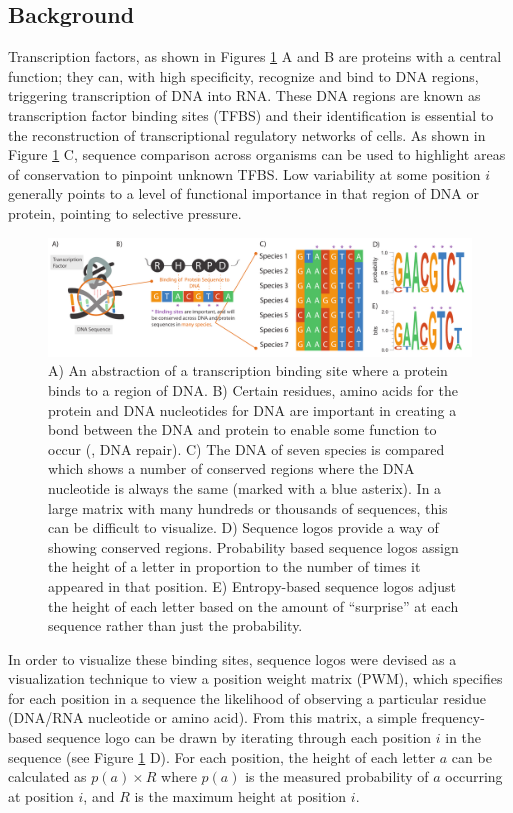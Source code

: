 \subsection{Background}

Transcription factors, as shown in Figures \ref{fig:binding} A and B are proteins with a central function; they can, with high specificity, recognize and bind to DNA regions, triggering transcription of DNA into RNA.
These DNA regions are known as transcription factor binding sites (TFBS) and their identification is essential to the reconstruction of transcriptional regulatory networks of cells.
As shown in Figure \ref{fig:binding} C, sequence comparison across organisms can be used to highlight areas of conservation to pinpoint unknown TFBS.
Low variability at some position $i$ generally points to a level of functional importance in that region of DNA or protein, pointing to selective pressure. 

\begin{figure}[h!]
\centering
\includegraphics[width=\textwidth]{images/other_glyphs/sequence_logo/binding}
\caption{A) An abstraction of a transcription binding site where a protein binds to a region of DNA.
B) Certain residues, amino acids for the protein and DNA nucleotides for DNA are important in creating a bond between the DNA and protein to enable some function to occur (\eg, DNA repair).
C) The DNA of seven species is compared which shows a number of conserved regions where the DNA nucleotide is always the same (marked with a blue asterix). In a large matrix with many hundreds or thousands of sequences, this can be difficult to visualize.
D) Sequence logos provide a way of showing conserved regions. Probability based sequence logos assign the height of a letter in proportion to the number of times it appeared in that position.
E) Entropy-based sequence logos adjust the height of each letter based on the amount of ``surprise'' at each sequence rather than just the probability.}
\label{fig:binding}
\end{figure}

In order to visualize these binding sites, sequence logos were devised as a visualization technique to view a position weight matrix (PWM), which specifies for each position in a sequence the likelihood of observing a particular residue (DNA/RNA nucleotide or amino acid). From this matrix, a simple frequency-based sequence logo can be drawn by iterating through each position $i$ in the sequence (see Figure \ref{fig:binding} D). For each position, the height of each letter $a$ can be calculated as $p(a) \times R$ where $p(a)$ is the measured probability of $a$ occurring at position $i$, and $R$ is the maximum height at position $i$.

